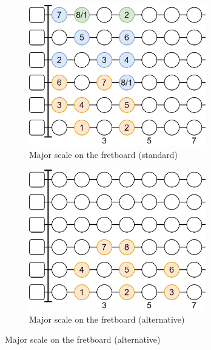 \begin{figure}[h]
	\begin{subfigure}[b]{0.45\textwidth}
		\centering
		\includegraphics[width=0.85\textwidth]{../../Images/guitar_major_scale_standard.png}
		\caption{Major scale on the fretboard (standard)}
		\label{fig:guitar_major_scale_fretboard_standard}
	\end{subfigure}
	\hfill
	\begin{subfigure}[b]{0.45\textwidth}
		\centering
		\includegraphics[width=0.85\textwidth]{../../Images/guitar_major_scale_three_string.png}
		\caption{Major scale on the fretboard (alternative)}
		\label{fig:guitar_major_scale_fretboard_alt}
	\end{subfigure}
	

\end{figure}
